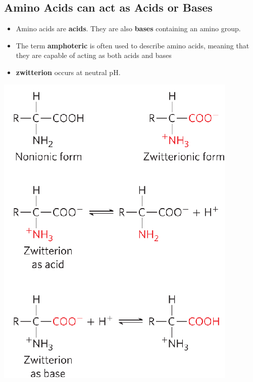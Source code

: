 \documentclass[10pt]{article}
\begin{document}
\subsection*{Amino Acids can act as Acids or Bases}
\begin{itemize}
    \item Amino acids are \textbf{acids}.  They are also \textbf{bases} containing an amino group.
    \item The term \textbf{amphoteric} is often used to describe amino acids, meaning that they are capable of acting as both acids and bases
    \item \textbf{zwitterion} occurs at neutral pH.
\end{itemize}
\begin{center}
    \includegraphics[scale=0.6]{L1_8.png}
\end{center}
\end{document}
